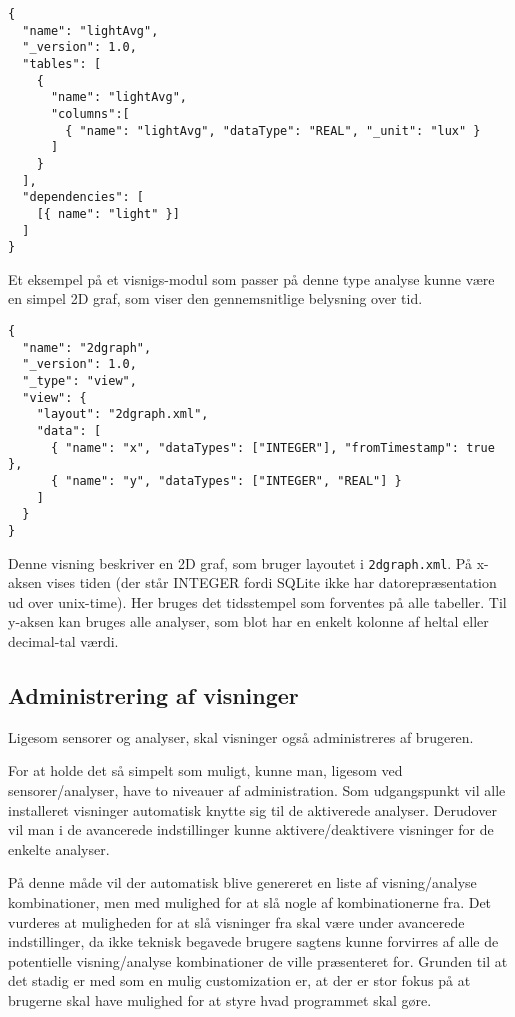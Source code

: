 \begin{lstlisting}
{
  "name": "lightAvg",
  "_version": 1.0,
  "tables": [
    {
      "name": "lightAvg",
      "columns":[
        { "name": "lightAvg", "dataType": "REAL", "_unit": "lux" }
      ]
    }
  ],
  "dependencies": [
    [{ name": "light" }]
  ]
}
\end{lstlisting}

Et eksempel på et visnigs-modul som passer på denne type analyse kunne være en simpel 2D graf, som viser den gennemsnitlige belysning over tid.

\begin{lstlisting}
{
  "name": "2dgraph",
  "_version": 1.0,
  "_type": "view",
  "view": {
    "layout": "2dgraph.xml",
    "data": [
      { "name": "x", "dataTypes": ["INTEGER"], "fromTimestamp": true },
      { "name": "y", "dataTypes": ["INTEGER", "REAL"] }
    ]
  }
}
\end{lstlisting}

Denne visning beskriver en 2D graf, som bruger layoutet i \texttt{2dgraph.xml}.
På x-aksen vises tiden (der står INTEGER fordi SQLite ikke har datorepræsentation ud over unix-time).
Her bruges det tidsstempel som forventes på alle tabeller.
Til y-aksen kan bruges alle analyser, som blot har en enkelt kolonne af heltal eller decimal-tal værdi.

\subsection{Administrering af visninger}
Ligesom sensorer og analyser, skal visninger også administreres af brugeren.

For at holde det så simpelt som muligt, kunne man, ligesom ved sensorer/analyser, have to niveauer af administration.
Som udgangspunkt vil alle installeret visninger automatisk knytte sig til de aktiverede analyser.
Derudover vil man i de avancerede indstillinger kunne aktivere/deaktivere visninger for de enkelte analyser.

På denne måde vil der automatisk blive genereret en liste af visning/analyse kombinationer, men med mulighed for at slå nogle af kombinationerne fra.
Det vurderes at muligheden for at slå visninger fra skal være under avancerede indstillinger, da ikke teknisk begavede brugere sagtens kunne forvirres af alle de potentielle visning/analyse kombinationer de ville præsenteret for.
Grunden til at det stadig er med som en mulig customization er, at der er stor fokus på at brugerne skal have mulighed for at styre hvad programmet skal gøre. 
